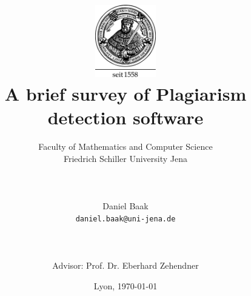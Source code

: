 \vspace{-50pt}
\title{\includegraphics[width=0.20\textwidth]{uni-jena-logo.pdf}\\
				A brief survey of Plagiarism detection software
        }
\author{%
        Faculty of Mathematics and Computer Science\\
        Friedrich Schiller University Jena\\ 
        \rule{\textwidth}{0.5pt}\\
        {Daniel Baak}\\
        \texttt{daniel.baak@uni-jena.de}\\[-8pt]
        \rule{\textwidth}{0.5pt}\\
        Advisor: Prof. Dr. Eberhard Zehendner
        \vspace{\fill}
        }
\date{Lyon, \today}

\maketitle
